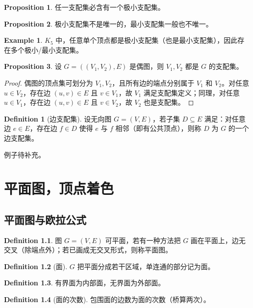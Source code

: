 \documentclass[oneside]{book}
\theoremstyle{definition}
\newtheorem{example}{Example}[section]
\newtheorem{proposition}{Proposition}[section]
\newtheorem{definition}{Definition}[section]
\begin{document}
\begin{proposition}
	任一支配集必含有一个极小支配集。
\end{proposition}
\begin{proposition}
	极小支配集不是唯一的，最小支配集一般也不唯一。
\end{proposition}

\begin{example}
	\( K_5 \) 中，任意单个顶点都是极小支配集（也是最小支配集），因此存在多个极小/最小支配集。
\end{example}

\begin{proposition}
	设 \( G = ((V_1, V_2), E) \) 是偶图，则 \( V_1, V_2 \) 都是 \( G \) 的支配集。
\end{proposition}
\begin{proof}
	偶图的顶点集可划分为 \( V_1, V_2 \)，且所有边的端点分别属于 \( V_1 \) 和 \( V_2 \)。对任意 \( u \in V_2 \)，存在边 \( (u, v) \in E \) 且 \( v \in V_1 \)，故 \( V_1 \) 满足支配集定义；同理，对任意 \( u \in V_1 \)，存在边 \( (u, v) \in E \) 且 \( v \in V_2 \)，故 \( V_2 \) 也是支配集。
\end{proof}
\begin{definition}[边支配集]
	设无向图 \( G = (V, E) \)，若子集 \( D \subseteq E \) 满足：对任意边 \( e \in E \)，存在边 \( f \in D \) 使得 \( e \) 与 \( f \) 相邻（即有公共顶点），则称 \( D \) 为 \( G \) 的一个边支配集。
\end{definition}

例子待补充。
\chapter{平面图，顶点着色}
	\section{平面图与欧拉公式}

\begin{definition}
	图 \( G=(V,E) \) 可平面，若有一种方法把 \( G \) 画在平面上，边无交叉（除端点外）；若已画成无交叉形式，则称平面图。
\end{definition}

\begin{definition}[面]
	\( G \) 把平面分成若干区域，单连通的部分记为面。
\end{definition}
\begin{definition}
	有界面为内部面，无界面为外部面。
\end{definition}
\begin{definition}[面的次数]
	包围面的边数为面的次数（桥算两次）。
\end{definition}
\end{document}
